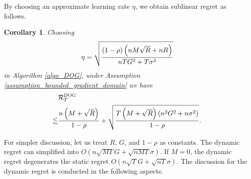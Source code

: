 \documentclass{article}
\newtheorem{Corollary}{\bf{Corollary}}
\begin{document}
By choosing an approximate learning rate $\eta$, we obtain sublinear regret as follows.
\begin{Corollary}
\label{corollary_regret_upper_bound}
Choosing 
\begin{align}
\nonumber
\eta = \sqrt{\frac{(1-\rho) \left( nM\sqrt{R} + nR \right)}{ nTG^2 + T\sigma^2 }}
\end{align} in Algorithm \ref{algo_DOG}, under Assumption \ref{assumption_bounded_gradient_domain} we have
\begin{align}
\label{equa_result_Corollary}
& {\mathcal{R}}_T^{\textsc{DOG}} \\ \nonumber
\lesssim &  \frac{n\left( M+\sqrt{R} \right)}{1-\rho} + \sqrt{\frac{T\left( M+\sqrt{R} \right)(n^2G^2 + n\sigma^2)}{1-\rho}}.
\end{align}
\end{Corollary}
For simpler discussion, let us treat $R$, $G$, and $1-\rho$ as constants. The dynamic regret can simplified into $O(n\sqrt{MT}G + \sqrt{nMT}\sigma)$. If $M=0$, the dynamic regret degenerates the static regret $O(n\sqrt{T}G + \sqrt{nT}\sigma)$.
The discussion for the dynamic regret is conducted in the following aspects.
\end{document}
